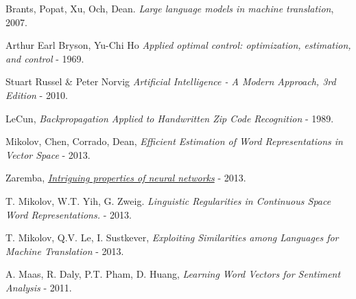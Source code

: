 \documentclass[12pt]{article}
\begin{document}
\begin{thebibliography}{20}
   Brants, Popat, Xu, Och, Dean. {\em Large language models in machine
  translation}, 2007.

   Arthur Earl Bryson, Yu-Chi Ho
  {\em Applied optimal control: optimization, estimation, and control} - 1969.

   Stuart Russel \& Peter Norvig
  {\em Artificial Intelligence - A Modern Approach, 3rd Edition} - 2010.

   LeCun,
  {\em Backpropagation Applied to Handwritten Zip Code Recognition} - 1989.

   Mikolov, Chen, Corrado, Dean,
  {\em Efficient Estimation of Word Representations in Vector Space} - 2013.

   Zaremba, \href{http://cs.nyu.edu/~zaremba/docs/understanding.pdf}
  {{\em Intriguing properties of neural networks}} - 2013.

   T. Mikolov, W.T. Yih, G. Zweig.
  {\em Linguistic Regularities in Continuous Space Word Representations.} - 2013.

   T. Mikolov, Q.V. Le, I. Sustkever,
  {\em Exploiting Similarities among Languages for Machine Translation} - 2013.

   A. Maas, R. Daly, P.T. Pham, D. Huang, {\em Learning Word Vectors for Sentiment Analysis} - 2011.

\end{thebibliography}
\end{document}
